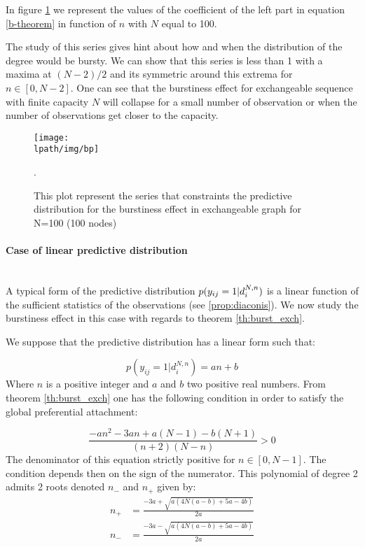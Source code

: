 In figure \ref{fig:bp} we represent the values of the coefficient of the left part in equation \eqref{b-theorem} in function of $n$ with $N$ equal to 100.
	
The study of this series gives hint about how and when the distribution of the degree would be bursty. We can show that this series is less than 1 with a maxima at $(N-2)/2$ and its symmetric around this extrema for $n \in [0, N-2]$. One can see that the burstiness effect for exchangeable sequence with finite capacity $N$ will collapse for a small number of observation or when the number of observations get closer to the capacity.
	
	\begin{figure}[h]
		\centering
		\texttt{[image: \\lpath/img/bp]}
		\caption{This plot represent the series that constraints the predictive distribution for the burstiness effect in exchangeable graph for N=100 (100 nodes)}.
		\label{fig:bp}
	\end{figure}



\paragraph{Case of linear predictive distribution}~\\

A typical form of the predictive distribution $p(y_{ij}=1 | d_i^{N,n})$ is a linear function of the sufficient statistics of the observations (see \ref{prop:diaconis}). We now study the burstiness effect in this case with regards to theorem \ref{th:burst_exch}.

We suppose that the predictive distribution has a linear form such that:

\begin{equation*}
p(y_{ij}=1 | d_i^{N,n}) = an+b
\end{equation*}  
Where $n$ is a positive integer and $a$ and $b$ two positive real numbers. From theorem \ref{th:burst_exch} one has the following condition in order to satisfy the global preferential attachment:

\begin{equation} \label{eq:polynom}
\frac{-an^2 -3an +a(N-1)-b(N+1)}{(n+2)(N-n)} > 0 
\end{equation}
The denominator of this equation strictly positive for $n \in [0, N-1]$. The condition depends then on the sign of the numerator. This polynomial of degree 2 admits 2 roots denoted $n_-$ and $n_+$ given by:
\begin{align*}
n_+ &= \frac{-3a + \sqrt{a(4N(a-b)+5a-4b)}}{2a} \\
n_- &= \frac{-3a - \sqrt{a(4N(a-b)+5a-4b)}}{2a} \\
\end{align*}

